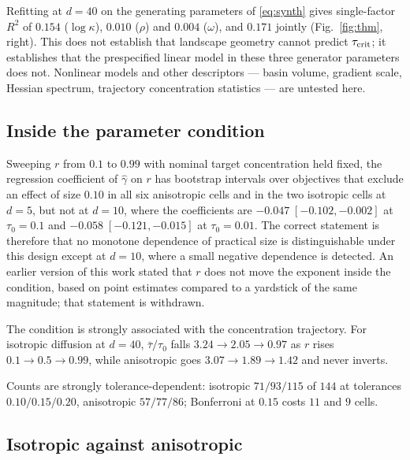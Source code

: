 \documentclass[pdflatex,sn-mathphys-num]{sn-jnl}
\theoremstyle{thmstyleone}
\theoremstyle{thmstyletwo}
\theoremstyle{thmstylethree}
\begin{document}
Refitting at $d=40$ on the generating parameters of \eqref{eq:synth} gives single-factor $R^2$ of $0.154$ ($\log\kappa$), $0.010$ ($\rho$) and $0.004$ ($\omega$), and $0.171$ jointly (Fig.~\ref{fig:thm}, right). This does not establish that landscape geometry cannot predict $\tau_{\rm crit}$; it establishes that the prespecified linear model in these three generator parameters does not. Nonlinear models and other descriptors --- basin volume, gradient scale, Hessian spectrum, trajectory concentration statistics --- are untested here.

\subsection{Inside the parameter condition}\label{sec:sigma}

Sweeping $r$ from $0.1$ to $0.99$ with nominal target concentration held fixed, the regression coefficient of $\hat\gamma$ on $r$ has bootstrap intervals over objectives that exclude an effect of size $0.10$ in all six anisotropic cells and in the two isotropic cells at $d=5$, but not at $d=10$, where the coefficients are $-0.047\;[-0.102,-0.002]$ at $\tau_0=0.1$ and $-0.058\;[-0.121,-0.015]$ at $\tau_0=0.01$. The correct statement is therefore that no monotone dependence of practical size is distinguishable under this design except at $d=10$, where a small negative dependence is detected. An earlier version of this work stated that $r$ does not move the exponent inside the condition, based on point estimates compared to a yardstick of the same magnitude; that statement is withdrawn.

The condition is strongly associated with the concentration trajectory. For isotropic diffusion at $d=40$, $\bar\tau/\tau_0$ falls $3.24\to2.05\to0.97$ as $r$ rises $0.1\to0.5\to0.99$, while anisotropic goes $3.07\to1.89\to1.42$ and never inverts.

Counts are strongly tolerance-dependent: isotropic $71/93/115$ of $144$ at tolerances $0.10/0.15/0.20$, anisotropic $57/77/86$; Bonferroni at $0.15$ costs $11$ and $9$ cells.

\subsection{Isotropic against anisotropic}\label{sec:aniso}
\end{document}
